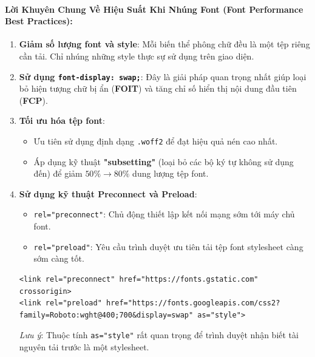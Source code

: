 \documentclass[11pt,oneside]{book}
\newcommand{\codeinline}[1]{\textcolor{accentOrange}{\texttt{#1}}}
\newcommand{\term}[1]{\textbf{\textcolor{primaryBlue}{#1}}}
\begin{document}
\paragraph{Lời Khuyên Chung Về Hiệu Suất Khi Nhúng Font (Font Performance Best Practices):}

\begin{tipBox}
\begin{enumerate}[leftmargin=1.5em, itemsep=3pt, parsep=0pt]
    \item \textbf{Giảm số lượng font và style}: Mỗi biến thể phông chữ đều là một tệp riêng cần tải. Chỉ nhúng những style thực sự sử dụng trên giao diện.
    \item \textbf{Sử dụng \codeinline{font-display: swap;}}: Đây là giải pháp quan trọng nhất giúp loại bỏ hiện tượng chữ bị ẩn (\term{FOIT}) và tăng chỉ số hiển thị nội dung đầu tiên (\term{FCP}).
    \item \textbf{Tối ưu hóa tệp font}:
    \begin{itemize}[leftmargin=1.2em, itemsep=2pt]
        \item Ưu tiên sử dụng định dạng \codeinline{.woff2} để đạt hiệu quả nén cao nhất.
        \item Áp dụng kỹ thuật \term{"subsetting"} (loại bỏ các bộ ký tự không sử dụng đến) để giảm $50\% \rightarrow 80\%$ dung lượng tệp font.
    \end{itemize}
    \item \textbf{Sử dụng kỹ thuật Preconnect và Preload}:
    \begin{itemize}[leftmargin=1.2em, itemsep=2pt]
        \item \codeinline{rel="preconnect"}: Chủ động thiết lập kết nối mạng sớm tới máy chủ font.
        \item \codeinline{rel="preload"}: Yêu cầu trình duyệt ưu tiên tải tệp font stylesheet càng sớm càng tốt.
    \end{itemize}
    \begin{codeWindow}
\begin{lstlisting}[language=HTML5]
<link rel="preconnect" href="https://fonts.gstatic.com" crossorigin>
<link rel="preload" href="https://fonts.googleapis.com/css2?family=Roboto:wght@400;700&display=swap" as="style">
\end{lstlisting}
    \end{codeWindow}
    \textit{Lưu ý}: Thuộc tính \codeinline{as="style"} rất quan trọng để trình duyệt nhận biết tài nguyên tải trước là một stylesheet.
\end{enumerate}
\end{tipBox}
\end{document}
